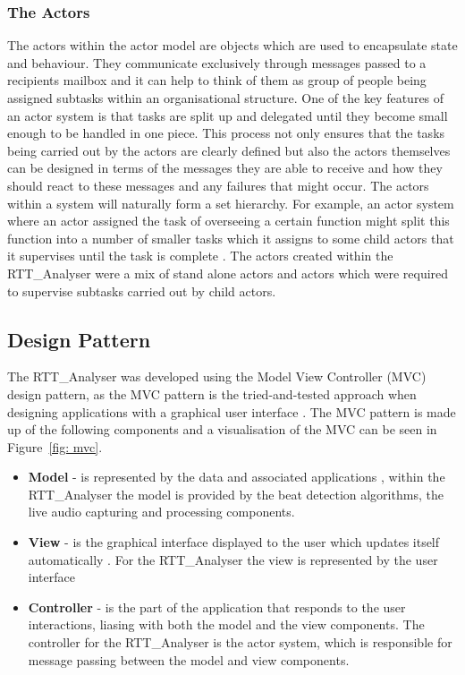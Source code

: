 \documentclass[a4paper, 11pt]{article}
\begin{document}
\subsubsection{The Actors}
The actors within the actor model are objects which are used to encapsulate state and behaviour. They communicate exclusively through messages passed to a recipients mailbox and it can help to think of them as group of people being assigned subtasks within an organisational structure. One of the key features of an actor system is that tasks are split up and delegated until they become small enough to be handled in one piece. This process not only ensures that the tasks being carried out by the actors are clearly defined but also the actors themselves can be designed in terms of the messages they are able to receive and how they should react to these messages and any failures that might occur. The actors within a system will naturally form a set hierarchy. For example, an actor system where an actor assigned the task of overseeing a certain function might split this function into a number of smaller tasks which it assigns to some child actors that it supervises until the task is complete \cite{acotrsys}. The actors created within the RTT\_Analyser were a mix of stand alone actors and actors which were required to supervise subtasks carried out by child actors.

\subsection{Design Pattern}
The RTT\_Analyser was developed using the Model View Controller (MVC) design pattern, as the MVC pattern is the tried-and-tested approach when designing applications with a graphical user interface \cite{designPatterns}. The MVC pattern is made up of the following components and a visualisation of the MVC can be seen in Figure~\ref{fig: mvc}. 

\begin{itemize}
\item \textbf{Model} - is represented by the data and associated applications \cite{designPatterns}, within the RTT\_Analyser the model is provided by the beat detection algorithms, the live audio capturing and processing components.\\
\item \textbf{View} - is the graphical interface displayed to the user which updates itself automatically \cite{designPatterns}. For the RTT\_Analyser the view is represented by the user interface\\
\item \textbf{Controller} - is the part of the application that responds to the user interactions, liasing with both the model and the view components\cite{designPatterns}. The controller for the RTT\_Analyser is the actor system, which is responsible for message passing between the model and view components.
\end{itemize}
\end{document}

